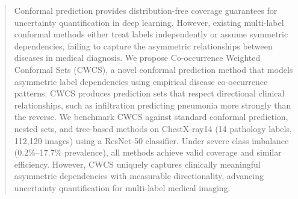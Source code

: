 \begin{abstract}
Conformal prediction provides distribution-free coverage guarantees for uncertainty quantification in deep learning. However, existing multi-label conformal methods either treat labels independently or assume symmetric dependencies, failing to capture the asymmetric relationships between diseases in medical diagnosis.
We propose Co-occurrence Weighted Conformal Sets (CWCS), a novel conformal prediction method that models asymmetric label dependencies using empirical disease co-occurrence patterns. CWCS produces prediction sets that respect directional clinical relationships, such as infiltration predicting pneumonia more strongly than the reverse.
We benchmark CWCS against standard conformal prediction, nested sets, and tree-based methods on ChestX-ray14 (14 pathology labels, 112,120 images) using a ResNet-50 classifier. Under severe class imbalance (0.2\%--17.7\% prevalence), all methods achieve valid coverage and similar efficiency. However, CWCS uniquely captures clinically meaningful asymmetric dependencies with measurable directionality, advancing uncertainty quantification for multi-label medical imaging.
\end{abstract}

